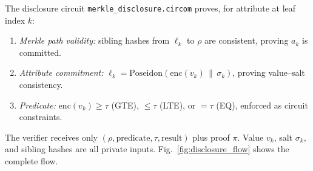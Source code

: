 \documentclass[journal,twoside,10pt]{IEEEtran}
\begin{document}
The disclosure circuit \texttt{merkle\_disclosure.circom} proves, for
attribute at leaf index $k$:
\begin{enumerate}
  \item \textit{Merkle path validity:} sibling hashes from $\ell_k$ to
        $\rho$ are consistent, proving $a_k$ is committed.
  \item \textit{Attribute commitment:}
        $\ell_k = \mathrm{Poseidon}(\mathrm{enc}(v_k) \,\|\, \sigma_k)$,
        proving value--salt consistency.
  \item \textit{Predicate:}
        $\mathrm{enc}(v_k) \geq \tau$ (GTE), $\leq \tau$ (LTE),
        or $= \tau$ (EQ), enforced as circuit constraints.
\end{enumerate}

The verifier receives only $(\rho, \text{predicate}, \tau, \text{result})$
plus proof $\pi$. Value $v_k$, salt $\sigma_k$, and sibling hashes are
all private inputs. Fig.~\ref{fig:disclosure_flow} shows the complete flow.
\end{document}
